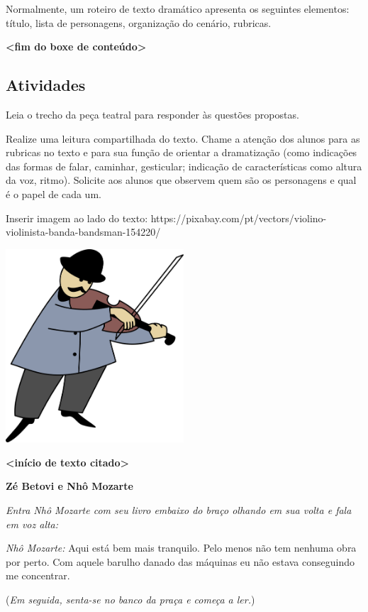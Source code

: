 Normalmente, um roteiro de texto dramático apresenta os seguintes
elementos: título, lista de personagens, organização do cenário,
rubricas.

\textbf{\textless{}fim do boxe de conteúdo\textgreater{}}

\subsection{Atividades}\label{atividades-1}

Leia o trecho da peça teatral para responder às questões propostas.

Realize uma leitura compartilhada do texto. Chame a atenção dos alunos
para as rubricas no texto e para sua função de orientar a dramatização
(como indicações das formas de falar, caminhar, gesticular; indicação de
características como altura da voz, ritmo). Solicite aos alunos que
observem quem são os personagens e qual é o papel de cada um.

Inserir imagem ao lado do texto:
https://pixabay.com/pt/vectors/violino-violinista-banda-bandsman-154220/

\includegraphics[width=2.61389in,height=2.83858in]{media/image2.png}

\textbf{\textless{}início de texto citado\textgreater{}}

\textbf{Zé Betovi e Nhô Mozarte}

\emph{\emph{Entra Nhô Mozarte com seu livro embaixo do braço olhando em
sua volta e fala em voz alta: }}

\emph{Nhô Mozarte:} Aqui está bem mais tranquilo. Pelo menos não tem
nenhuma obra por perto. Com aquele barulho danado das máquinas eu não
estava conseguindo me concentrar.

(\emph{Em seguida, senta-se no banco da praça e começa a ler.})


